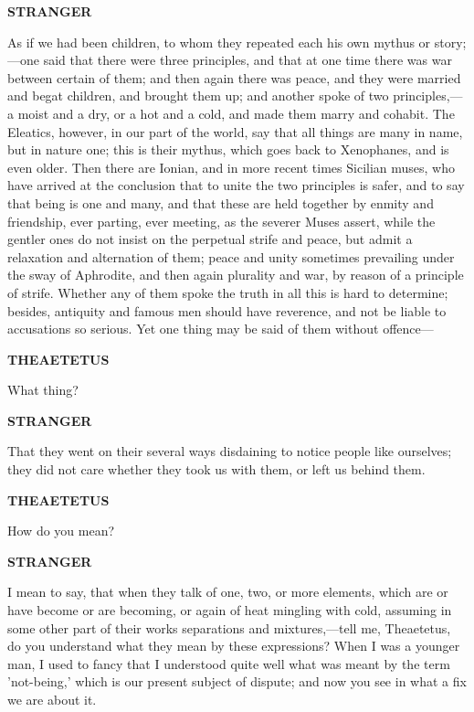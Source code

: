 \documentclass[11pt,letter]{article}
\begin{document}
\par \textbf{STRANGER}
\par   As if we had been children, to whom they repeated each his own mythus or story;—one said that there were three principles, and that at one time there was war between certain of them; and then again there was peace, and they were married and begat children, and brought them up; and another spoke of two principles,—a moist and a dry, or a hot and a cold, and made them marry and cohabit. The Eleatics, however, in our part of the world, say that all things are many in name, but in nature one; this is their mythus, which goes back to Xenophanes, and is even older. Then there are Ionian, and in more recent times Sicilian muses, who have arrived at the conclusion that to unite the two principles is safer, and to say that being is one and many, and that these are held together by enmity and friendship, ever parting, ever meeting, as the severer Muses assert, while the gentler ones do not insist on the perpetual strife and peace, but admit a relaxation and alternation of them; peace and unity sometimes prevailing under the sway of Aphrodite, and then again plurality and war, by reason of a principle of strife. Whether any of them spoke the truth in all this is hard to determine; besides, antiquity and famous men should have reverence, and not be liable to accusations so serious. Yet one thing may be said of them without offence—

\par \textbf{THEAETETUS}
\par   What thing?

\par \textbf{STRANGER}
\par   That they went on their several ways disdaining to notice people like ourselves; they did not care whether they took us with them, or left us behind them.

\par \textbf{THEAETETUS}
\par   How do you mean?

\par \textbf{STRANGER}
\par   I mean to say, that when they talk of one, two, or more elements, which are or have become or are becoming, or again of heat mingling with cold, assuming in some other part of their works separations and mixtures,—tell me, Theaetetus, do you understand what they mean by these expressions? When I was a younger man, I used to fancy that I understood quite well what was meant by the term 'not-being,' which is our present subject of dispute; and now you see in what a fix we are about it.
\end{document}
